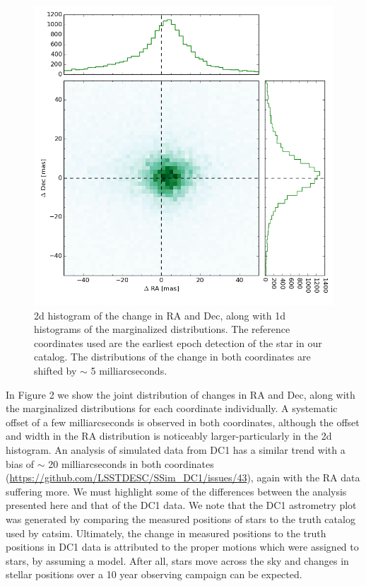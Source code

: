 \documentclass[DM,toc]{lsstdoc}
\begin{document}
\begin{figure}[h!]
    \includegraphics[width=.9\textwidth]{astrom_ra_dec_internal.png}
    \caption{2d histogram of the change in RA and Dec, along with 1d histograms of the marginalized distributions. The reference coordinates used are the earliest epoch detection of the star in our catalog. The distributions of the change in both coordinates are shifted by $\sim$ 5 milliarcseconds.}
\end{figure}

In Figure 2 we show the joint distribution of changes in RA and Dec, along with the marginalized distributions for each coordinate individually. A systematic offset of a few milliarcseconds is observed in both coordinates, although the offset and width in the RA distribution is noticeably larger-particularly in the 2d histogram. An analysis of simulated data from DC1 has a similar trend with a bias of $\sim$ 20 milliarcseconds in both coordinates (\url{https://github.com/LSSTDESC/SSim_DC1/issues/43}), again with the RA data suffering more.
We must highlight some of the differences between the analysis presented here and that of the DC1 data. We note that the DC1 astrometry plot was generated by comparing the measured positions of stars to the truth catalog used by catsim. Ultimately, the change in measured positions to the truth positions in DC1 data is attributed to the proper motions which were assigned to stars, by assuming a model. After all, stars move across the sky and changes in stellar positions over a 10 year observing campaign can be expected.
\end{document}
